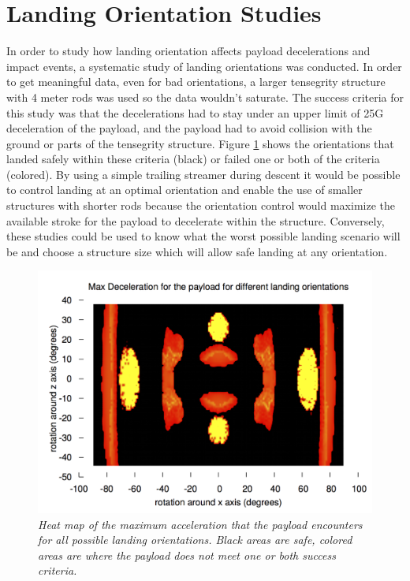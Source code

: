 \section{Landing Orientation Studies}
In order to study how landing orientation affects payload decelerations and impact events, a systematic study of landing orientations was conducted.  In order to get meaningful data, even for bad orientations, a larger tensegrity structure with 4 meter rods was used so the data wouldn't saturate.  The success criteria for this study was that the decelerations had to stay under an upper limit of 25G deceleration of the payload, and the payload had to avoid collision with the ground or parts of the tensegrity structure.  Figure \ref{fig:landingHeatMapRot} shows the orientations that landed safely within these criteria (black) or failed one or both of the criteria (colored).  By using a simple trailing streamer during descent it would be possible to control landing at an optimal orientation and enable the use of smaller structures with shorter rods because the orientation control would maximize the available stroke for the payload to decelerate within the structure.  Conversely, these studies could be used to know what the worst possible landing scenario will be and choose a structure size which will allow safe landing at any orientation.

\begin{figure}[htbp]
   \centering
   \includegraphics[width=0.8\columnwidth]{tex/images/landing/landingHeatMapRot.png}
   \caption{\em Heat map of the maximum acceleration that the payload encounters for all possible landing orientations. Black areas are safe, colored areas are where the payload does not meet one or both success criteria.}
   \label{fig:landingHeatMapRot}
\end{figure}

